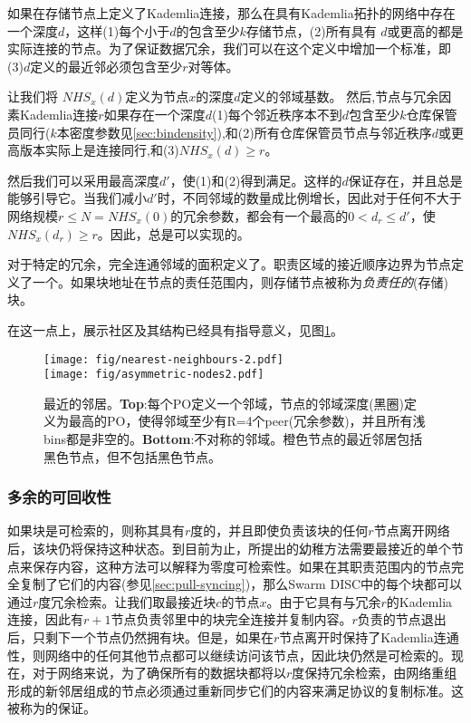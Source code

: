 如果在存储节点上定义了Kademlia连接，那么在具有Kademlia拓扑的网络中存在一个深度$d$，这样(1)每个小于$d$的包含至少$k$存储节点，(2)所有具有 $d$或更高的都是实际连接的节点。为了保证数据冗余，我们可以在这个定义中增加一个标准，即(3)$d$定义的最近邻必须包含至少$r$对等体。

让我们将 $\mathit{NHS}_x(d)$定义为节点$x$的深度$d$定义的邻域基数。
然后,节点与冗余因素Kademlia连接$r$如果存在一个深度$d$(1)每个邻近秩序本不到$d$包含至少$k$仓库保管员同行($k$本密度参数见\ref{sec:bindensity}),和(2)所有仓库保管员节点与邻近秩序$d$或更高版本实际上是连接同行,和(3)$\mathit{NHS}_x(d)\geq r$。

然后我们可以采用最高深度$d'$，使(1)和(2)得到满足。这样的$d$保证存在，并且总是能够引导它。当我们减小$d'$时，不同邻域的数量成比例增长，因此对于任何不大于网络规模$r\leq N=\mathit{NHS}_x(0)$的冗余参数，都会有一个最高的$0<d_r\leq d'$，使$\mathit{NHS}_x(d_r)\geq r$。因此，总是可以实现的。



对于特定的冗余，完全连通邻域的面积定义了。职责区域的接近顺序边界为节点定义了一个。如果块地址在节点的责任范围内，则存储节点被称为\emph{负责任的}(存储)块。

在这一点上，展示社区及其结构已经具有指导意义，见图\ref{fig:nearest-neighbours}。 

\begin{figure}[htbp]
   \centering
   \texttt{[image: fig/nearest-neighbours-2.pdf]} \\\texttt{[image: fig/asymmetric-nodes2.pdf]}
   \caption[最近的邻居\statusgreen]{最近的邻居。\textbf{Top}:每个PO定义一个邻域，节点的邻域深度(黑圈)定义为最高的PO，使得邻域至少有R=4个peer(冗余参数)，并且所有浅bins都是非空的。\textbf{Bottom}:不对称的邻域。橙色节点的最近邻居包括黑色节点，但不包括黑色节点。}
   \label{fig:nearest-neighbours}
\end{figure}


\subsubsection{多余的可回收性}

如果块是可检索的，则称其具有$r$度的，并且即使负责该块的任何$r$节点离开网络后，该块仍将保持这种状态。到目前为止，所提出的幼稚方法需要最接近的单个节点来保存内容，这种方法可以解释为零度可检索性。如果在其职责范围内的节点完全复制了它们的内容(参见\ref{sec:pull-syncing})，那么Swarm DISC中的每个块都可以通过$r$度冗余检索。让我们取最接近块$c$的节点$x$。由于它具有与冗余$r$的Kademlia连接，因此有$r+1$节点负责邻里中的块完全连接并复制内容。$r$负责的节点退出后，只剩下一个节点仍然拥有块。但是，如果在$r$节点离开时保持了Kademlia连通性，则网络中的任何其他节点都可以继续访问该节点，因此块仍然是可检索的。现在，对于网络来说，为了确保所有的数据块都将以$r$度保持冗余检索，由网络重组形成的新邻居组成的节点必须通过重新同步它们的内容来满足协议的复制标准。这被称为的保证。

